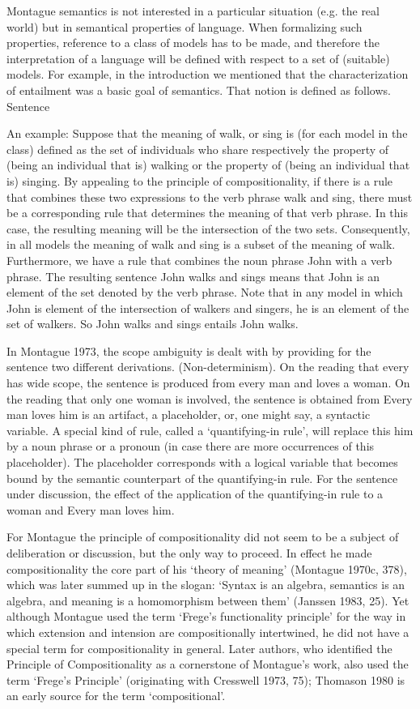 \documentclass[11pt]{book}
\begin{document}
Montague semantics is not interested in a particular situation (e.g. the real world) but in semantical properties of language. When formalizing such properties, reference to a class of models has to be made, and therefore the interpretation of a language will be defined with respect to a set of (suitable) models. For example, in the introduction we mentioned that the characterization of entailment was a basic goal of semantics. That notion is defined as follows. Sentence 


An example: Suppose that the meaning of walk, or sing is (for each model in the class) defined as the set of individuals who share respectively the property of (being an individual that is) walking or the property of (being an individual that is) singing. By appealing to the principle of compositionality, if there is a rule that combines these two expressions to the verb phrase walk and sing, there must be a corresponding rule that determines the meaning of that verb phrase. In this case, the resulting meaning will be the intersection of the two sets. Consequently, in all models the meaning of walk and sing is a subset of the meaning of walk. Furthermore, we have a rule that combines the noun phrase John with a verb phrase. The resulting sentence John walks and sings means that John is an element of the set denoted by the verb phrase. Note that in any model in which John is element of the intersection of walkers and singers, he is an element of the set of walkers. So John walks and sings entails John walks.

In Montague 1973, the scope ambiguity is dealt with by providing for the sentence two different derivations. (Non-determinism). On the reading that every has wide scope, the sentence is produced from every man and loves a woman. On the reading that only one woman is involved, the sentence is obtained from Every man loves him
is an artifact, a placeholder, or, one might say, a syntactic variable. A special kind of rule, called a ‘quantifying-in rule’, will replace this him
by a noun phrase or a pronoun (in case there are more occurrences of this placeholder). The placeholder corresponds with a logical variable that becomes bound by the semantic counterpart of the quantifying-in rule. For the sentence under discussion, the effect of the application of the quantifying-in rule to a woman and Every man loves him.

For Montague the principle of compositionality did not seem to be a subject of deliberation or discussion, but the only way to proceed. In effect he made compositionality the core part of his ‘theory of meaning’ (Montague 1970c, 378), which was later summed up in the slogan: ‘Syntax is an algebra, semantics is an algebra, and meaning is a homomorphism between them’ (Janssen 1983, 25). Yet although Montague used the term ‘Frege’s functionality principle’ for the way in which extension and intension are compositionally intertwined, he did not have a special term for compositionality in general. Later authors, who identified the Principle of Compositionality as a cornerstone of Montague’s work, also used the term ‘Frege’s Principle’ (originating with Cresswell 1973, 75); Thomason 1980 is an early source for the term ‘compositional’.
\end{document}
